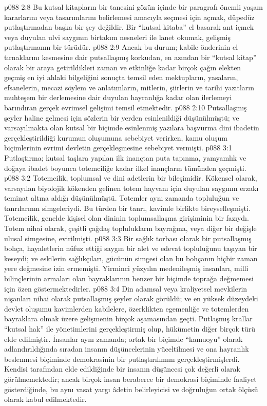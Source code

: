 \vs p088 2:8 Bu kutsal kitapların bir tanesini gözün içinde bir paragrafı önemli yaşam kararlarını veya tasarımlarını belirlemesi amacıyla seçmesi için açmak, düpedüz putlaştırmadan başka bir şey değildir. Bir “kutsal kitaba” el basarak ant içmek veya duyulan ulvi saygının birtakım nesneleri ile lanet okumak, gelişmiş putlaştırmanın bir türüdür.
\vs p088 2:9 Ancak bu durum; kabile önderinin el tırnaklarını kesmesine dair putsallaşmış korkudan, en azından bir “kutsal kitap” olarak bir araya getirildikleri zaman ve etkinliğe kadar birçok çağın elekten geçmiş en iyi ahlaki bilgeliğini sonuçta temsil eden mektupların, yasaların, efsanelerin, mecazi söylem ve anlatımların, mitlerin, şiirlerin ve tarihi yazıtların muhteşem bir derlemesine dair duyulan hayranlığa kadar olan ilerlemeyi barındıran gerçek evrimsel gelişimi temsil etmektedir.
\vs p088 2:10 Putsallaşmış şeyler haline gelmesi için sözlerin bir yerden esinlenildiği düşünülmüştü; ve varsayılmakta olan kutsal bir biçimde esinlenmiş yazılara başvurma dini ibadetin gerçekleştirildiği kurumun  oluşumuna sebebiyet verirken, kamu oluşum biçimlerinin evrimi devletin  gerçekleşmesine sebebiyet vermişti.
\vs p088 3:1 Putlaştırma; kutsal taşlara yapılan ilk inançtan puta tapınma, yamyamlık ve doğaya ibadet boyunca totemciliğe kadar ilkel inançların tümünden geçmişti.
\vs p088 3:2 Totemcilik, toplumsal ve dini adetlerin bir bileşimidir. Kökensel olarak, varsayılan biyolojik kökenden gelinen totem hayvanı için duyulan saygının erzakı teminat altına aldığı düşünülmüştü. Totemler aynı zamanda topluluğun ve tanrılarının simgeleriydi. Bu türden bir tanrı, kavimle birlikte bireyselleşmişti. Totemcilik, genelde kişisel olan dininin toplumsallaşma girişiminin bir fazıydı. Totem nihai olarak, çeşitli çağdaş toplulukların bayrağına, veya diğer bir değişle ulusal simgesine, evirilmişti.
\vs p088 3:3 Bir sağlık torbası olarak bir putsallaşmış bohça, hayaletlerin nüfuz ettiği saygın bir alet ve edevat topluluğunu taşıyan bir keseydi; ve eskilerin sağlıkçıları, gücünün simgesi olan bu bohçanın hiçbir zaman yere değmesine izin ermemişti. Yirminci yüzyılın medenileşmiş insanları, milli bilinçlerinin armaları olan bayraklarının benzer bir biçimde toprağa değmemesi için özen göstermektedirler.
\vs p088 3:4 Din adamsal veya kraliyetsel mevkilerin nişanları nihai olarak putsallaşmış şeyler olarak görüldü; ve en yüksek düzeydeki devlet oluşumu kavimlerden kabilelere, özerklikten egemenliğe ve totemlerden bayraklara olmak üzere gelişmenin birçok aşamasından geçti. Putlaşmış krallar “kutsal hak” ile yönetimlerini gerçekleştirmiş olup, hükümetin diğer birçok türü elde edilmiştir. İnsanlar aynı zamanda; ortak bir biçimde “kamuoyu” olarak adlandırıldığında sıradan insanın düşüncelerinin yüceltilmesi ve ona hayranlık beslenmesi biçiminde demokrasinin bir putlaştırılımını gerçekleştirmişlerdi. Kendisi tarafından elde edildiğinde bir insanın düşüncesi çok değerli olarak görülmemektedir; ancak birçok insan beraberce bir demokrasi biçiminde faaliyet gösterdiğinde, bu aynı vasat yargı âdetin belirleyicisi ve doğruluğun ortak ölçüsü olarak kabul edilmektedir.
